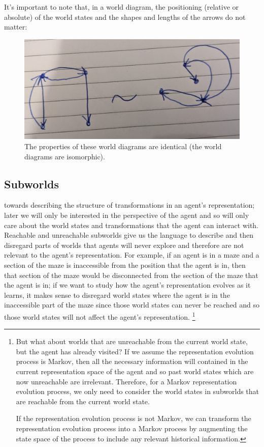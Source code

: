 It's important to note that, in a world diagram, the positioning (relative or absolute) of the world states and the shapes and lengths of the arrows do not matter:
\begin{figure}[H]
	\centering
	\includegraphics[width=0.5\linewidth]{2MathematicalFramework/Images/isomorphic_world_diagrams.jpeg}
	\caption{The properties of these world diagrams are identical (the world diagrams are isomorphic).}
	\label{fig:isomorphic_world_diagrams}
\end{figure}

\subsection{Subworlds}

 towards describing the structure of transformations in an agent's representation; later we will only be interested in the perspective of the agent and so will only care about the world states and transformations that the agent can interact with.
Reachable and unreachable subworlds give us the language to describe and then disregard parts of worlds that agents will never explore and therefore are not relevant to the agent's representation.
For example, if an agent is in a maze and a section of the maze is inaccessible from the position that the agent is in, then that section of the maze would be disconnected from the section of the maze that the agent is in; if we want to study how the agent’s representation evolves as it learns, it makes sense to disregard world states where the agent is in the inaccessible part of the maze since those world states can never be reached and so those world states will not affect the agent's representation.
\footnote{
	But what about worlds that are unreachable from the current world state, but the agent has already visited?
	If we assume the representation evolution process is Markov, then all the necessary information will contained in the current representation space of the agent and so past world states which are now unreachable are irrelevant.
	Therefore, for a Markov representation evolution process, we only need to consider the world states in subworlds that are reachable from the current world state.

	If the representation evolution process is not Markov, we can transform the representation evolution process into a Markov process by augmenting the state space of the process to include any relevant historical information.
}


